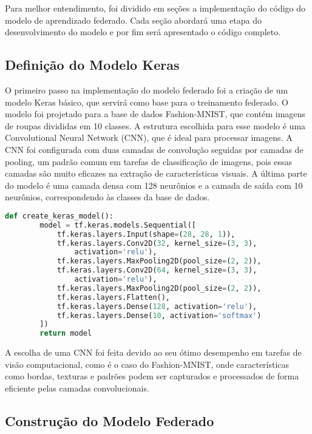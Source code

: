 Para melhor entendimento, foi dividido em seções a implementação do código do modelo de aprendizado federado. Cada seção abordará uma etapa do desenvolvimento do modelo e por fim será apresentado o código completo.

\subsection{Definição do Modelo Keras}

O primeiro passo na implementação do modelo federado foi a criação de um modelo Keras básico, que servirá como base para o treinamento federado. O modelo foi projetado para a base de dados Fashion-MNIST, que contém imagens de roupas divididas em 10 classes. A estrutura escolhida para esse modelo é uma Convolutional Neural Network (CNN), que é ideal para processar imagens. A CNN foi configurada com duas camadas de convolução seguidas por camadas de pooling, um padrão comum em tarefas de classificação de imagens, pois essas camadas são muito eficazes na extração de características visuais. A última parte do modelo é uma camada densa com 128 neurônios e a camada de saída com 10 neurônios, correspondendo às classes da base de dados.

\begin{lstlisting}[language=Python, caption={Função para criar um modelo Keras}, label={lst:create_keras_model}]
    def create_keras_model():
        model = tf.keras.models.Sequential([
            tf.keras.layers.Input(shape=(28, 28, 1)),
            tf.keras.layers.Conv2D(32, kernel_size=(3, 3), 
                activation='relu'),
            tf.keras.layers.MaxPooling2D(pool_size=(2, 2)),
            tf.keras.layers.Conv2D(64, kernel_size=(3, 3), 
                activation='relu'),
            tf.keras.layers.MaxPooling2D(pool_size=(2, 2)),
            tf.keras.layers.Flatten(),
            tf.keras.layers.Dense(128, activation='relu'),
            tf.keras.layers.Dense(10, activation='softmax')
        ])
        return model
\end{lstlisting}
    
A escolha de uma CNN foi feita devido ao seu ótimo desempenho em tarefas de visão computacional, como é o caso do Fashion-MNIST, onde características como bordas, texturas e padrões podem ser capturados e processados de forma eficiente pelas camadas convolucionais.

\subsection{Construção do Modelo Federado}

